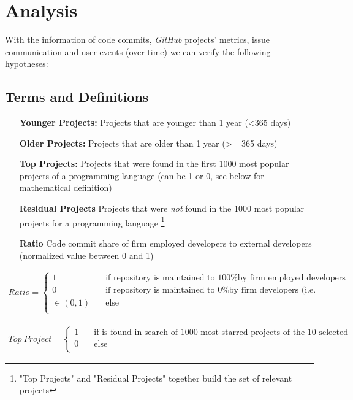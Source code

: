 \clearpage
\section{Analysis}
\label{sec:empirical_findings}

With the information of code commits, \textit{GitHub} projects' metrics, issue communication and user events (over time) we can verify the following hypotheses:



\subsection{Terms and Definitions}
\label{sec:lm_terms_and_definitions}
\begin{itemize}
	\item [\textbf{Younger Projects:}] Projects that are younger than 1 year (\textless 365 days)
	\item [\textbf{Older Projects:}] Projects that are older than 1 year (\textgreater= 365 days)
	\item [\textbf{Top Projects:}] Projects that were found in the first 1000 most popular projects of a programming language (can be 1 or 0, see below for mathematical definition)
	\item [\textbf{Residual Projects}] Projects that were \textit{not} found in the 1000 most popular projects for a programming language \footnote{"Top Projects" and "Residual Projects" together build the set of relevant projects}
	\item [\textbf{Ratio}] Code commit share of firm employed developers to external developers (normalized value between 0 and 1)
\end{itemize}

\begin{align}
\mathit{Ratio} =
	\begin{cases}
		1         & \quad \text{if repository is maintained to 100\% by firm employed developers only}\\
		0         & \quad \text{if repository is maintained to 0\% by firm developers (i.e. 100\% external developers)}\\
		\in (0,1) & \quad \text{else}\\
	\end{cases}
\end{align}

\begin{align}
\mathit{Top \ Project} =
	\begin{cases}
		1         & \quad \text{if is found in search of 1000 most starred projects of the 10 selected Languages}\\
		0         & \quad \text{else}\\
	\end{cases}
\end{align}

